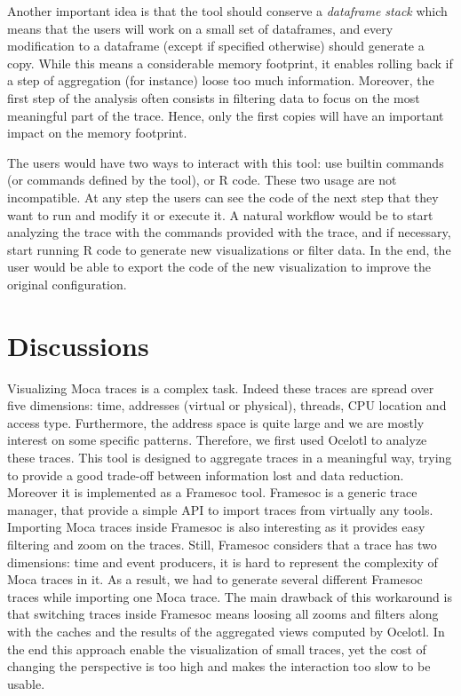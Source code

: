 Another important idea is that the tool should conserve a \emph{dataframe stack} which means that the users will work on a small set of dataframes, and every modification to a dataframe (except if specified otherwise) should generate a copy.
While this means a considerable memory footprint, it enables rolling back if a step of aggregation (for instance) loose too much information.
Moreover, the first step of the analysis often consists in filtering data to focus on the most meaningful part of the trace.
Hence, only the first copies will have an important impact on the memory footprint.

The users would have two ways to interact with this tool: use builtin commands (or commands defined by the tool), or \gls{R} code.
These two usage are not incompatible.
At any step the users can see the code of the next step that they want to run and modify it or execute it.
A natural workflow would be to start analyzing the trace with the commands provided with the trace, and if necessary, start running \gls{R} code to generate new visualizations or filter data.
In the end, the user would be able to export the code of the new visualization to improve the original configuration.

\section{Discussions}
\label{sec:visu-cncl}

Visualizing \gls{Moca} traces is a complex task.
Indeed these traces are spread over five dimensions: time, addresses (virtual or physical), threads, \gls{CPU} location and access type.
Furthermore, the address space is quite large and we are mostly interest on some specific patterns.
Therefore, we first used \gls{Ocelotl} to analyze these traces.
This tool is designed to aggregate traces in a meaningful way, trying to provide a good trade-off between information lost and data reduction.
Moreover it is implemented as a \gls{Framesoc} tool.
\gls{Framesoc} is a generic trace manager, that provide a simple \gls{API} to import traces from virtually any tools.
Importing \gls{Moca} traces inside \gls{Framesoc} is also interesting as it provides easy filtering and zoom on the traces.
Still, \gls{Framesoc} considers that a trace has two dimensions: time and event producers, it is hard to represent the complexity of \gls{Moca} traces in it.
As a result, we had to generate several different \gls{Framesoc} traces while importing one \gls{Moca} trace.
The main drawback of this workaround is that switching traces inside \gls{Framesoc} means loosing all zooms and filters along with the caches and the results of the aggregated views computed by \gls{Ocelotl}.
In the end this approach enable the visualization of small traces, yet the cost of changing the perspective is too high and makes the interaction too slow to be usable.

